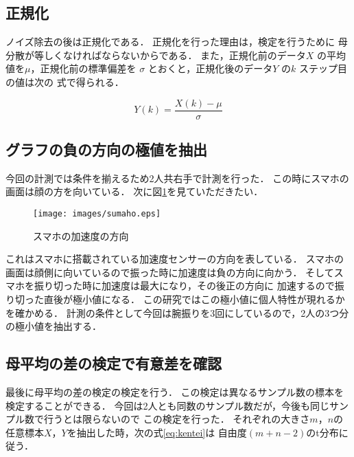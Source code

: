 \subsection{正規化}
ノイズ除去の後は正規化である．
正規化を行った理由は，検定を行うために
母分散が等しくなければならないからである．
また，正規化前のデータ$X$ の平均値を$\mu$，正規化前の標準偏差を
$\sigma$ とおくと，正規化後のデータ$Y$ の$k$ ステップ目の値は次の
式で得られる．

\begin{equation}
    Y(k) = \frac{X(k) - \mu}{\sigma}
    \label{eq:seikika}
\end{equation}

\subsection{グラフの負の方向の極値を抽出}

今回の計測では条件を揃えるため2人共右手で計測を行った．
この時にスマホの画面は顔の方を向いている．
次に図\ref{fig:sumaho}を見ていただきたい．

\begin{figure}[tb]
\begin{center}
\vspace{45mm}
\texttt{[image: images/sumaho.eps]}
\hspace{3.0cm}
\caption{スマホの加速度の方向}
\label{fig:sumaho}
\end{center}
\end{figure}
これはスマホに搭載されている加速度センサーの方向を表している．
スマホの画面は顔側に向いているので振った時に加速度は負の方向に向かう．
そしてスマホを振り切った時に加速度は最大になり，その後正の方向に
加速するので振り切った直後が極小値になる．
この研究ではこの極小値に個人特性が現れるかを確かめる．
計測の条件として今回は腕振りを3回にしているので，2人の3つ分の極小値を抽出する．

\subsection{母平均の差の検定で有意差を確認}

最後に母平均の差の検定の検定を行う．
この検定は異なるサンプル数の標本を検定することができる．
今回は2人とも同数のサンプル数だが，今後も同じサンプル数で行うとは限らないので
この検定を行った．
それぞれの大きさ$m$，$n$の任意標本$X$，$Y$を抽出した時，次の式\ref{eq:kentei}は
自由度$(m + n - 2)$のt分布に従う．

